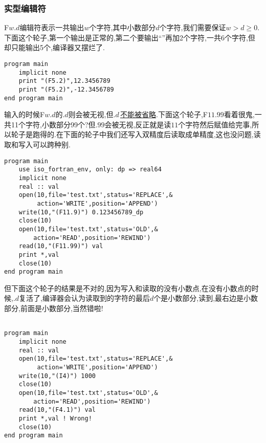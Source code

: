 \subsubsection{实型编辑符}

F$w.d$编辑符表示一共输出$w$个字符,其中小数部分$d$个字符,我们需要保证$w>d\geqslant0$.下面这个轮子,第一个输出是正常的,第二个要输出``''再加2个字符,一共6个字符,但却只能输出5个,编译器又摆烂了.
\begin{lstlisting}
program main
    implicit none
    print "(F5.2)",12.3456789
    print "(F5.2)",-12.3456789
end program main
\end{lstlisting}

输入的时候F$w.d$的$.d$则会被无视,但$.d\,$\uline{不能被省略}.下面这个轮子,F$11.99$看着很鬼,一共11个字符,小数部分99个?但$.99$会被无视,反正就是读$11$个字符然后赋值给完事,所以轮子是跑得的.在下面的轮子中我们还写入双精度后读取成单精度,这也没问题,读取和写入可以跨种别.
\begin{lstlisting}
program main
    use iso_fortran_env, only: dp => real64
    implicit none
    real :: val
    open(10,file='test.txt',status='REPLACE',&
         action='WRITE',position='APPEND')
    write(10,"(F11.9)") 0.123456789_dp
    close(10)
    open(10,file='test.txt',status='OLD',&
        action='READ',position='REWIND')
    read(10,"(F11.99)") val
    print *,val
    close(10)
end program main
\end{lstlisting}
但下面这个轮子的结果是不对的,因为写入和读取的没有小数点,在没有小数点的时候,$.d$复活了,编译器会认为读取到的字符的最后$d$个是小数部分,读到,最右边是小数部分,前面是小数部分,当然错啦!
\begin{lstlisting}

program main
    implicit none
    real :: val
    open(10,file='test.txt',status='REPLACE',&
         action='WRITE',position='APPEND')
    write(10,"(I4)") 1000
    close(10)
    open(10,file='test.txt',status='OLD',&
        action='READ',position='REWIND')
    read(10,"(F4.1)") val
    print *,val ! Wrong!
    close(10)
end program main
\end{lstlisting}


